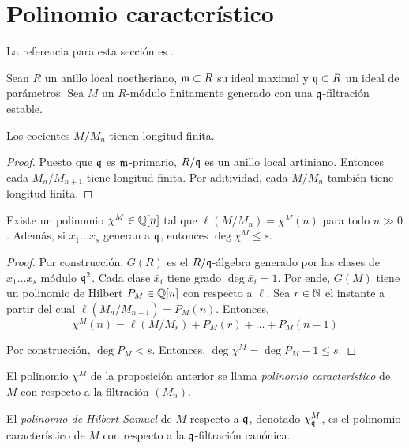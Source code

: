 \section{Polinomio característico}

\noindent La referencia para esta sección es \cite[pp. 118-120]{atiyah}.

\begin{preliminaries}
Sean $R$ un anillo local noetheriano, $\mathfrak m \subset R$ su ideal maximal y $\mathfrak q \subset R$ un ideal de parámetros. Sea $M$ un $R$-módulo finitamente generado con una $\mathfrak q$-filtración estable.
\end{preliminaries}

\begin{proposition}
Los cocientes $M/M_n$ tienen longitud finita.
\end{proposition}

\begin{proof}
Puesto que $\mathfrak q$ es $\mathfrak m$-primario, $R/\mathfrak q$ es un anillo local artiniano. Entonces cada $M_n / M_{n+1}$ tiene longitud finita. Por aditividad, cada $M/M_n$ también tiene longitud finita.
\end{proof}

\begin{proposition}
Existe un polinomio $\chi^M \in \mathbb Q[n]$ tal que $\ell(M/M_n) = \chi^M(n)$ para todo $n \gg 0$. Además, si $x_1 \dots x_s$ generan a $\mathfrak q$, entonces $\deg \chi^M \le s$.
\end{proposition}

\begin{proof}
Por construcción, $G(R)$ es el $R/\mathfrak q$-álgebra generado por las clases de $x_1 \dots x_s$ módulo $\mathfrak q^2$. Cada clase $\bar x_i$ tiene grado $\deg \bar x_i = 1$. Por ende, $G(M)$ tiene un polinomio de Hilbert $P_M \in \mathbb Q[n]$ con respecto a $\ell$. Sea $r \in \mathbb N$ el instante a partir del cual $\ell(M_n / M_{n+1}) = P_M(n)$. Entonces,
$$\chi^M(n) = \ell(M/M_r) + P_M(r) + \dots + P_M(n-1)$$

Por construcción, $\deg P_M < s$. Entonces, $\deg \chi^M = \deg P_M + 1 \le s$.
\end{proof}

\begin{definition}
El polinomio $\chi^M$ de la proposición anterior se llama \textit{polinomio característico} de $M$ con respecto a la filtración $(M_n)$.
\end{definition}

\begin{definition}
El \textit{polinomio de Hilbert-Samuel} de $M$ respecto a $\mathfrak q$, denotado $\chi_\mathfrak q^M$, es el polinomio característico de $M$ con respecto a la $\mathfrak q$-filtración canónica.
\end{definition}


